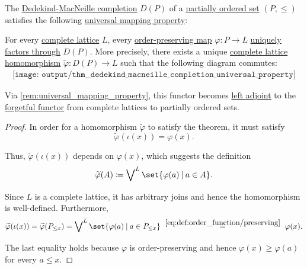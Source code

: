 \begin{theorem}\label{thm:dedekind_macneille_completion_universal_property}
  The \hyperref[def:dedekind_macnielle_completion]{Dedekind-MacNeille completion} \( D(P) \) of a \hyperref[def:partially_ordered_set]{partially ordered set} \( (P, \leq) \) satisfies the following \hyperref[rem:universal_mapping_property]{universal mapping property}:
  \begin{displayquote}
    For every \hyperref[def:lattice]{complete lattice} \( L \), every \hyperref[def:order_function/preserving]{order-preserving map} \( \varphi: P \to L \) \hyperref[def:factors_through]{uniquely factors through} \( D(P) \). More precisely, there exists a unique \hyperref[def:complete_lattice/homomorphism]{complete lattice homomorphism} \( \widetilde{\varphi}: D(P) \to L \) such that the following diagram commutes:
    \begin{equation}\label{eq:thm:dedekind_macneille_completion_universal_property/diagram}
      \begin{aligned}
        \texttt{[image: output/thm\_\_dedekind\_macneille\_completion\_universal\_property]}
      \end{aligned}
    \end{equation}
  \end{displayquote}
\end{theorem}
\begin{comments}
  \item Via \cref{rem:universal_mapping_property}, this functor becomes \hyperref[def:category_adjunction]{left adjoint} to the \hyperref[def:concrete_category]{forgetful functor} from complete lattices to partially ordered sets.
\end{comments}
\begin{proof}
  In order for a homomorphism \( \widetilde{\varphi} \) to satisfy the theorem, it must satisfy
  \begin{equation*}
    \widetilde{\varphi}(\iota(x)) = \varphi(x).
  \end{equation*}

  Thus, \( \widetilde{\varphi}(\iota(x)) \) depends on \( \varphi(x) \), which suggests the definition
  \begin{equation*}
    \widetilde{\varphi}(A) \coloneqq \bigvee\nolimits^L \set{ \varphi(a) \given a \in A }.
  \end{equation*}

  Since \( L \) is a complete lattice, it has arbitrary joins and hence the homomorphism is well-defined. Furthermore,
  \begin{equation*}
    \widetilde{\varphi}(\iota(x))
    =
    \widetilde{\varphi}(P_{\leq x})
    =
    \bigvee\nolimits^L \set{ \varphi(a) \given a \in P_{\leq x} }
    \reloset {\eqref{eq:def:order_function/preserving}} =
    \varphi(x).
  \end{equation*}

  The last equality holds because \( \varphi \) is order-preserving and hence \( \varphi(x) \geq \varphi(a) \) for every \( a \leq x \).
\end{proof}

